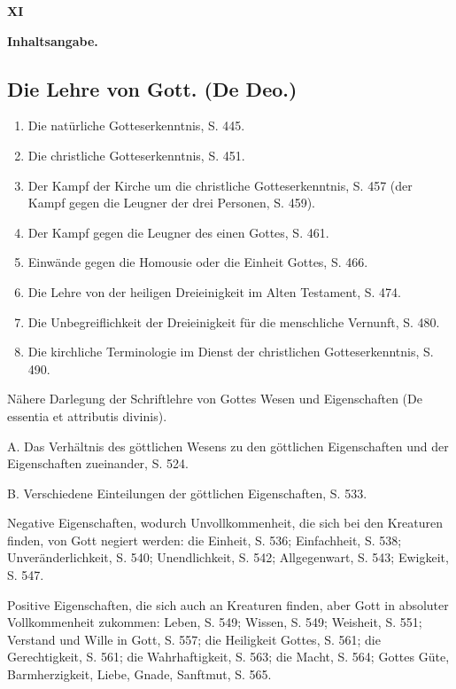 \begin{center}
\textbf{XI}

\textbf{Inhaltsangabe.}
\end{center}

\subsection*{\textbf{Die Lehre von Gott. (De Deo.)}}
\begin{enumerate}
  \item Die natürliche Gotteserkenntnis, S. 445.
  \item Die christliche Gotteserkenntnis, S. 451.
  \item Der Kampf der Kirche um die christliche Gotteserkenntnis, S. 457 (der Kampf gegen die Leugner der drei Personen, S. 459).
  \item Der Kampf gegen die Leugner des einen Gottes, S. 461.
  \item Einwände gegen die Homousie oder die Einheit Gottes, S. 466.
  \item Die Lehre von der heiligen Dreieinigkeit im Alten Testament, S. 474.
  \item Die Unbegreiflichkeit der Dreieinigkeit für die menschliche Vernunft, S. 480.
  \item Die kirchliche Terminologie im Dienst der christlichen Gotteserkenntnis, S. 490.
\end{enumerate}

Nähere Darlegung der Schriftlehre von Gottes Wesen und Eigenschaften (De essentia et attributis divinis).

A. Das Verhältnis des göttlichen Wesens zu den göttlichen Eigenschaften und der Eigenschaften zueinander, S. 524.

B. Verschiedene Einteilungen der göttlichen Eigenschaften, S. 533.

Negative Eigenschaften, wodurch Unvollkommenheit, die sich bei den Kreaturen finden, von Gott negiert werden: die Einheit, S. 536; Einfachheit, S. 538; Unveränderlichkeit, S. 540; Unendlichkeit, S. 542; Allgegenwart, S. 543; Ewigkeit, S. 547.

Positive Eigenschaften, die sich auch an Kreaturen finden, aber Gott in absoluter Vollkommenheit zukommen: Leben, S. 549; Wissen, S. 549; Weisheit, S. 551; Verstand und Wille in Gott, S. 557; die Heiligkeit Gottes, S. 561; die Gerechtigkeit, S. 561; die Wahrhaftigkeit, S. 563; die Macht, S. 564; Gottes Güte, Barmherzigkeit, Liebe, Gnade, Sanftmut, S. 565.


